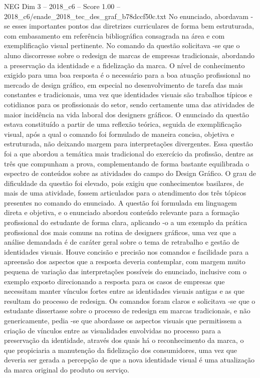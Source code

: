 \begin{textsample}{NEG Dim 3 – 2018\_c6 – Score 1.00 – 2018\_c6/enade\_2018\_tec\_des\_graf\_b78dccf50c.txt}
No enunciado, abordavam -se esses importantes pontos das diretrizes curriculares de forma bem estruturada, com embasamento em referência bibliográfica consagrada na área e com exemplificação visual pertinente.
No comando da questão solicitava -se que o aluno discorresse sobre o redesign de marcas de empresas tradicionais, abordando a preservação da identidade e a fidelização da marca.
O nível de conhecimento exigido para uma boa resposta é o necessário para a boa atuação profissional no mercado de design gráfico, em especial no desenvolvimento de tarefa das mais constantes e tradicionais, uma vez que identidades visuais são trabalhos típicos e cotidianos para os profissionais do setor, sendo certamente uma das atividades de maior incidência na vida laboral dos designers gráficos.
O enunciado da questão estava constituído a partir de uma reflexão teórica, seguida de exemplificação visual, após a qual o comando foi formulado de maneira concisa, objetiva e estruturada, não deixando margem para interpretações divergentes.
Essa questão foi a que abordou a temática mais tradicional do exercício da profissão, dentre as três que compunham a prova, complementando de forma bastante equilibrada o espectro de conteúdos sobre as atividades do campo do Design Gráfico.
O grau de dificuldade da questão foi elevado, pois exigiu que conhecimentos basilares, de mais de uma atividade, fossem articulados para o atendimento dos três tópicos presentes no comando do enunciado.
A questão foi formulada em linguagem direta e objetiva, e o enunciado abordou conteúdo relevante para a formação profissional do estudante de forma clara, aplicando -o a um exemplo da prática profissional dos mais comuns na rotina de designers gráficos, uma vez que a análise demandada é de caráter geral sobre o tema de retrabalho e gestão de identidades visuais.
Houve concisão e precisão nos comandos e facilidade para a apreensão dos aspectos que a resposta deveria contemplar, com margem muito pequena de variação das interpretações possíveis do enunciado, inclusive com o exemplo exposto direcionando a resposta para os casos de empresas que necessitam manter vínculos fortes entre as identidades visuais antigas e as que resultam do processo de redesign.
Os comandos foram claros e solicitava -se que o estudante dissertasse sobre o processo de redesign em marcas tradicionais, e não genericamente, pedia -se que abordasse os aspectos visuais que permitissem a criação de vínculos entre as visualidades envolvidas no processo para a preservação da identidade, através dos quais há o reconhecimento da marca, o que propiciaria a manutenção da fidelização dos consumidores, uma vez que deveria ser gerada a percepção de que a nova identidade visual é uma atualização da marca original do produto ou serviço.

\end{textsample}
